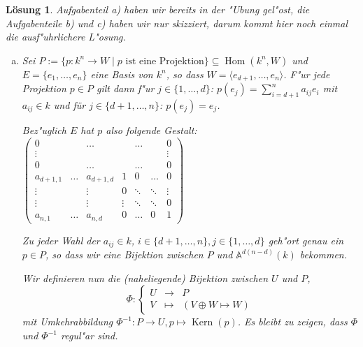 \documentclass[a4paper, 12pt, numbers=noendperiod, chapterprefix=true, headsepline]{scrbook}
\theoremstyle{break}
\newtheorem{Loes}{L\"osung}
\theoremstyle{nonumberbreak}
\theoremstyle{nonumberplain}
\DeclareMathOperator{\Hom}{Hom}
\DeclareMathOperator{\Kern}{Kern}
\newcommand{\A}{\mathbb{A}}
\begin{document}
\begin{Loes}
Aufgabenteil a) haben wir bereits in der "Ubung gel"ost, die Aufgabenteile b) und c) haben wir nur skizziert, darum kommt hier noch einmal die ausf"uhrlichere L"osung.
\begin{enumerate}[a)]
\item[b)]
	Sei $P:= \{ p:k^n \to W \mid p \textrm{ ist eine Projektion} \} \subseteq \Hom(k^n, W)$ und $E = \{ e_1, \dots, e_n\}$ eine Basis von $k^n$, so dass $W = \langle e_{d+1},\dots, e_n\rangle$. F"ur jede Projektion $p \in P$ gilt dann f"ur $j \in\{ 1,\dots, d\}$: $p(e_j) = \sum_{i = d+1}^n a_{ij} e_i$ mit $a_{ij}\in k$ und für $j \in \{d+1, \dots, n\}$: $p(e_j) = e_j$. 
 
	Bez"uglich $E$ hat $p$ also folgende Gestalt:
		$\begin{pmatrix}
		0& &\dots && \dots && 0 \\
		\vdots &&&&&& \vdots \\
		0 && \dots && \dots && 0 \\
		a_{d+1,1} & \dots & a_{d+1,d} & 1 & 0 &\dots &0\\
		\vdots & & \vdots & 0 &\ddots& \ddots & \vdots\\
		\vdots & & \vdots & \vdots & \ddots&\ddots&0 \\
		a_{n,1} & \dots & a_{n,d} & 0 &\dots &0& 1
		\end{pmatrix}$

	Zu jeder Wahl der $a_{ij} \in k$, $i \in \{d+1,\dots, n\}, j \in\{1, \dots, d\}$ geh"ort genau ein $p \in P$, so dass wir eine Bijektion zwischen $P$ und $\A^{d(n-d)}(k)$ bekommen.

	Wir definieren nun die (naheliegende) Bijektion zwischen $U$ und $P$, 
		\[\Phi \colon \left \{ \begin{array}{rcl}
                    U & \to & P \\
                    V & \mapsto & (V \oplus W \mapsto W)
                   \end{array} \right .\]
	mit Umkehrabbildung $\Phi^{-1}\colon P \to U ,  p \mapsto \Kern(p)$. Es bleibt zu zeigen, dass $\Phi$ und $\Phi^{-1}$ regul"ar sind.
 

\end{enumerate}
\end{Loes}
\end{document}
